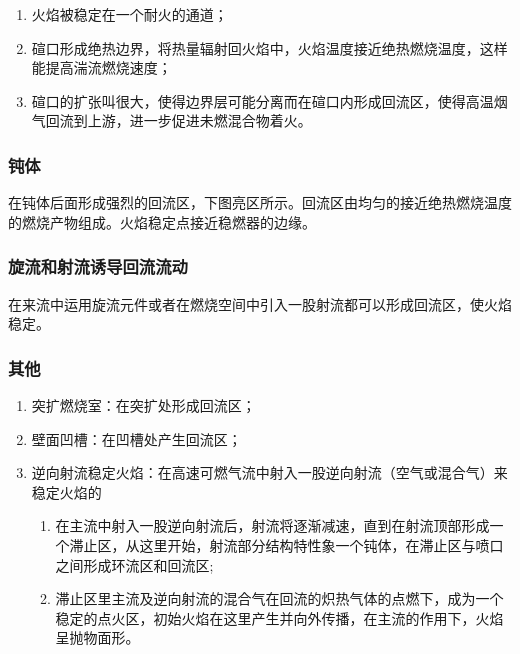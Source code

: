\begin{enumerate}
    \item 火焰被稳定在一个耐火的通道；
    \item 碹口形成绝热边界，将热量辐射回火焰中，火焰温度接近绝热燃烧温度，这样能提高湍流燃烧速度；
    \item 碹口的扩张叫很大，使得边界层可能分离而在碹口内形成回流区，使得高温烟气回流到上游，进一步促进未燃混合物着火。
\end{enumerate}
\subsubsection{钝体}
在钝体后面形成强烈的回流区，下图亮区所示。回流区由均匀的接近绝热燃烧温度的燃烧产物组成。火焰稳定点接近稳燃器的边缘。
\subsubsection{旋流和射流诱导回流流动}
在来流中运用旋流元件或者在燃烧空间中引入一股射流都可以形成回流区，使火焰稳定。
\subsubsection{其他}
\begin{enumerate}
    \item 突扩燃烧室：在突扩处形成回流区；
    \item 壁面凹槽：在凹槽处产生回流区；
    \item 逆向射流稳定火焰：在高速可燃气流中射入一股逆向射流（空气或混合气）来稳定火焰的
    \begin{enumerate}
        \item 在主流中射入一股逆向射流后，射流将逐渐减速，直到在射流顶部形成一个滞止区，从这里开始，射流部分结构特性象一个钝体，在滞止区与喷口之间形成环流区和回流区;
        \item 滞止区里主流及逆向射流的混合气在回流的炽热气体的点燃下，成为一个稳定的点火区，初始火焰在这里产生并向外传播，在主流的作用下，火焰呈抛物面形。
    \end{enumerate}
\end{enumerate}


